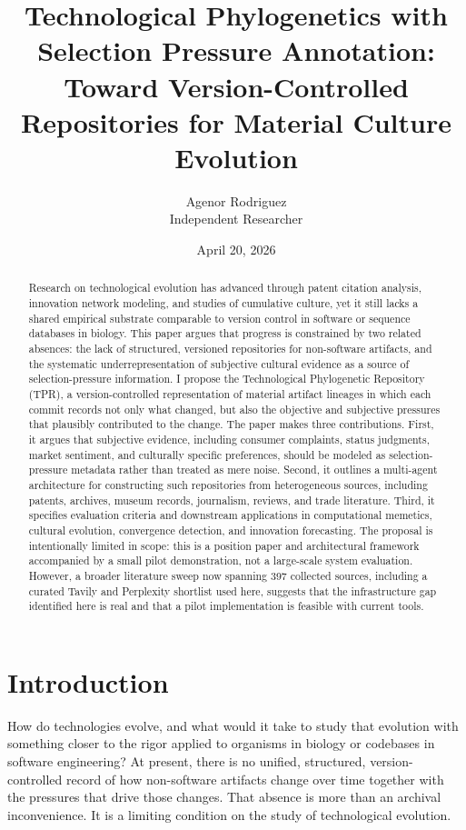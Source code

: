 \documentclass[11pt]{article}
\title{Technological Phylogenetics with Selection Pressure Annotation:
Toward Version-Controlled Repositories for Material Culture Evolution}
\author{Agenor Rodriguez\\Independent Researcher}
\date{April 20, 2026}
\begin{document}
\maketitle

\begin{abstract}
Research on technological evolution has advanced through patent citation analysis, innovation network modeling, and studies of cumulative culture, yet it still lacks a shared empirical substrate comparable to version control in software or sequence databases in biology. This paper argues that progress is constrained by two related absences: the lack of structured, versioned repositories for non-software artifacts, and the systematic underrepresentation of subjective cultural evidence as a source of selection-pressure information. I propose the Technological Phylogenetic Repository (TPR), a version-controlled representation of material artifact lineages in which each commit records not only what changed, but also the objective and subjective pressures that plausibly contributed to the change. The paper makes three contributions. First, it argues that subjective evidence, including consumer complaints, status judgments, market sentiment, and culturally specific preferences, should be modeled as selection-pressure metadata rather than treated as mere noise. Second, it outlines a multi-agent architecture for constructing such repositories from heterogeneous sources, including patents, archives, museum records, journalism, reviews, and trade literature. Third, it specifies evaluation criteria and downstream applications in computational memetics, cultural evolution, convergence detection, and innovation forecasting. The proposal is intentionally limited in scope: this is a position paper and architectural framework accompanied by a small pilot demonstration, not a large-scale system evaluation. However, a broader literature sweep now spanning 397 collected sources, including a curated Tavily and Perplexity shortlist used here, suggests that the infrastructure gap identified here is real and that a pilot implementation is feasible with current tools.
\end{abstract}

\section{Introduction}
How do technologies evolve, and what would it take to study that evolution with something closer to the rigor applied to organisms in biology or codebases in software engineering? At present, there is no unified, structured, version-controlled record of how non-software artifacts change over time together with the pressures that drive those changes. That absence is more than an archival inconvenience. It is a limiting condition on the study of technological evolution.
\end{document}
